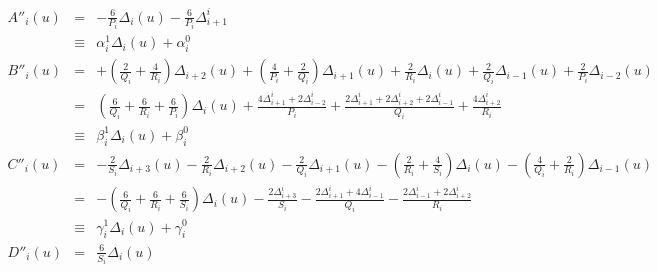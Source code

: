 \documentclass[a4paper,10pt,twosided]{article}
\begin{document}
\begin{eqnarray*}
     A''_i(u) &=& -\frac{6}{P_i}  \Delta_i(u) -\frac{6}{P_i}  \Delta^i_{i+1} 
\\           &\equiv&  \alpha_i^1 \Delta_i(u) + \alpha_i^0
\\   B''_i(u) &=& 
              +    \left( \frac{2}{Q_i} + \frac{4}{R_i} \right) \Delta_{i+2}(u)
              +    \left( \frac{4}{P_i} + \frac{2}{Q_i} \right)\Delta_{i+1}(u)
              +    \frac{2}{R_i}\Delta_i    (u)
              +    \frac{2}{Q_i}\Delta_{i-1}(u)
              +    \frac{2}{P_i}\Delta_{i-2}(u)
\\           &=& 
              \left(  \frac{6}{Q_i} + \frac{6}{R_i} +    \frac{6}{P_i} \right) \Delta_i(u) 
              +    \frac{4\Delta^i_{i+1}+2\Delta^i_{i-2}}{P_i} 
              +    \frac{2\Delta^i_{i+1}+2\Delta^i_{i+2}+2\Delta^i_{i-1}}{Q_i} 
              +    \frac{4\Delta^i_{i+2}}{R_i} 
\\           &\equiv&  \beta_i^1 \Delta_i(u) + \beta_i^0
\\   C''_i(u) &=&
              -    \frac{2}{S_i} \Delta_{i+3}(u)
              -    \frac{2}{R_i} \Delta_{i+2}(u)
              -    \frac{2}{Q_i} \Delta_{i+1}(u)
              - \left(   \frac{2}{R_i} + \frac{4}{S_i}\right) \Delta_i    (u)
              -  \left(  \frac{4}{Q_i} + \frac{2}{R_i}\right) \Delta_{i-1}(u)
\\            &=&
              - \left( \frac{6}{Q_i}+  \frac{6}{R_i} + \frac{6}{S_i}\right)  \Delta_i(u)
              -    \frac{2\Delta^i_{i+3} }{S_i} 
              -    \frac{2\Delta^i_{i+1}+4\Delta^i_{i-1} }{Q_i} 
              -    \frac{2\Delta^i_{i-1}+2 \Delta^i_{i+2}  }{R_i}
\\           &\equiv&  \gamma_i^1 \Delta_i(u) + \gamma_i^0
\\   D''_i(u) &=&  \frac{6}{S_i}\Delta_i    (u)
\end{eqnarray*}
\end{document}
